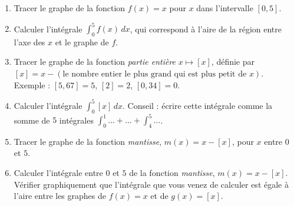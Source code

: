 \begin{exercice}\label{exoExamen-0001}
  \begin{enumerate}
  \item Tracer le graphe de la fonction $f(x)=x$ pour $x$ dans l'intervalle $[0,5]$.
    \item Calculer l'intégrale $\displaystyle \int_{0}^{5} f(x)\, dx$, qui correspond à l'aire de la région entre l'axe des $x$ et le graphe de $f$.
      \item Tracer le graphe de la fonction \emph{partie entière} $x\mapsto [x]$, définie par $[x]=x-(\textrm{le nombre entier le plus grand qui est plus petit de } x)$. Exemple : $[5,67]=5$, $[2]=2$, $[0,34]=0$.
        \item Calculer l'intégrale $\displaystyle \int_{0}^{5} [x]\, dx$. Conseil : écrire cette intégrale comme la somme de $5$ intégrales $\int_{0}^{1}\ldots+ \ldots +\int_{4}^{5}\ldots$. 
          \item Tracer le graphe de la fonction \emph{mantisse}, $m(x)=x-[x]$, pour $x$ entre $0$ et $5$.
          \item Calculer l'intégrale entre $0$ et $5$ de la fonction \emph{mantisse}, $m(x)=x-[x]$. Vérifier graphiquement que l'intégrale que vous venez de calculer est égale à l'aire entre les graphes de $f(x)=x$ et de $g(x)=[x]$.
        \begin{equation}
          
        \end{equation}
  \end{enumerate}
\end{exercice}
